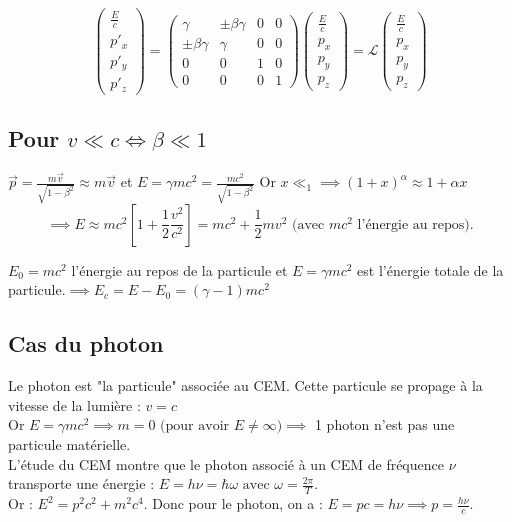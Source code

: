 \documentclass{article}
\begin{document}
\[
\begin{pmatrix} 
\frac{E}{c} \\ 
p'_x \\ 
p'_y \\ 
p'_z  
\end{pmatrix} 
= 
\begin{pmatrix} 
\gamma & \pm\beta \gamma & 0 & 0 \\ 
\pm\beta \gamma & \gamma & 0 & 0 \\ 
0 & 0 & 1 & 0 \\ 
0 & 0 & 0 & 1 
\end{pmatrix} 
\begin{pmatrix} 
\frac{E}{c} \\ 
p_x \\ 
p_y \\ 
p_z 
\end{pmatrix}
 = \mathcal{L} \begin{pmatrix} \frac{E}{c} \\ p_x \\ p_y \\ p_z \end{pmatrix} 
\]
\pagebreak
\subsection{Pour \(v\ll c \Leftrightarrow \beta \ll 1 \)}

\(\vec{p} = \frac{m\vec{v}}{\sqrt{1-\beta ^2}} \approx m\vec{v}  \) et \(E = \gamma mc^2 = \frac{mc^2}{\sqrt{1-\beta ^2} }\) Or \(x\ll_1 \implies (1+x)^{\alpha }\approx 1+\alpha x\)\\
\[
    \implies E \approx mc^2 \left[1 + \frac{1}{2} \frac{v^2}{c^2}\right] = mc^2 + \frac{1}{2} mv^2 \text{ (avec $mc^2$ l'énergie au repos)}.
\]

\(E_0 = mc^2 \) l'énergie au repos de la particule et \(E = \gamma mc^2\) est l'énergie totale de la particule.\(\implies E_c = E-E_0 = (\gamma -1)mc^2\)
\subsection{Cas du photon}
Le photon est "la particule" associée au CEM. Cette particule se propage à la vitesse de la lumière : \(v = c\)\\
Or \(E = \gamma mc^2 \implies m =0 \text{ (pour avoir $E\neq \infty$)}\implies \) 1 photon n'est pas une particule matérielle.\\


L'étude du CEM montre que le photon associé à un CEM de fréquence $\nu$  transporte une énergie : $E = h\nu = \hbar \omega \text{ avec } \omega = \frac{2\pi}{T} $.\\
Or : \(E^2 = p^2c^2+m^2c^{4}\). Donc pour le photon, on a : \(E = pc  = h\nu \implies p = \frac{h\nu}{c}\).\\
\end{document}
